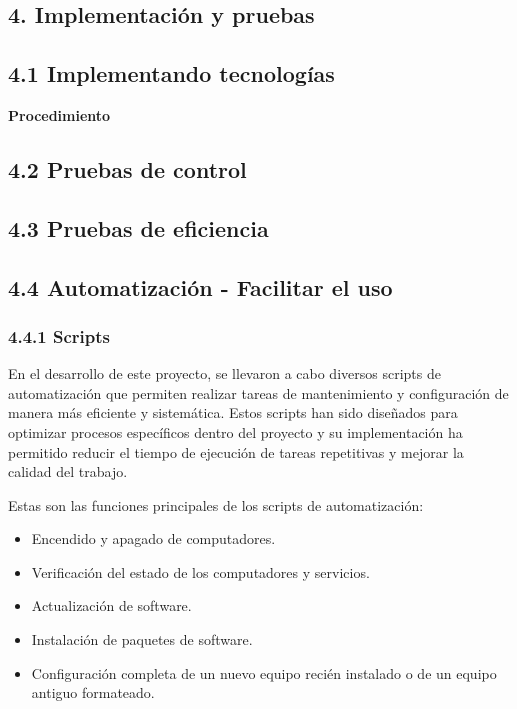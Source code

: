 \begin{spacing}{1.5}
\begin{tightcenter}
\section{4. Implementación y pruebas}
\mylinespacing
\end{tightcenter}

\subsection{4.1 Implementando tecnologías}

\textbf{Procedimiento}

\subsection{4.2 Pruebas de control}

    \subsection{4.3 Pruebas de eficiencia}

    \subsection{4.4 Automatización - Facilitar el uso}

    \subsubsection{4.4.1 Scripts}

    En el desarrollo de este proyecto, se llevaron a cabo diversos scripts de automatización que permiten realizar tareas de mantenimiento y configuración de manera más eficiente y sistemática. Estos scripts han sido diseñados para optimizar procesos específicos dentro del proyecto y su implementación ha permitido reducir el tiempo de ejecución de tareas repetitivas y mejorar la calidad del trabajo.

    Estas son las funciones principales de los scripts de automatización:

    \begin{itemize}
        \item Encendido y apagado de computadores.
        \item Verificación del estado de los computadores y servicios.
        \item Actualización de software.
        \item Instalación de paquetes de software.
        \item Configuración completa de un nuevo equipo recién instalado o de un equipo antiguo formateado.
    \end{itemize}
   

\end{spacing}
